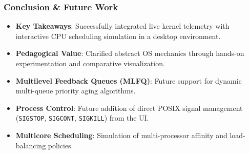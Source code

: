 \documentclass[aspectratio=169,10pt]{beamer}
\begin{document}
\begin{frame}
  \frametitle{Conclusion \& Future Work}
  \begin{itemize}
    \item \textbf{Key Takeaways}: Successfully integrated live kernel telemetry with interactive CPU scheduling simulation in a desktop environment.
    \item \textbf{Pedagogical Value}: Clarified abstract OS mechanics through hands-on experimentation and comparative visualization.
    \item \textbf{Multilevel Feedback Queues (MLFQ)}: Future support for dynamic multi-queue priority aging algorithms.
    \item \textbf{Process Control}: Future addition of direct POSIX signal management (\texttt{SIGSTOP}, \texttt{SIGCONT}, \texttt{SIGKILL}) from the UI.
    \item \textbf{Multicore Scheduling}: Simulation of multi-processor affinity and load-balancing policies.
  \end{itemize}
\end{frame}
\end{document}
